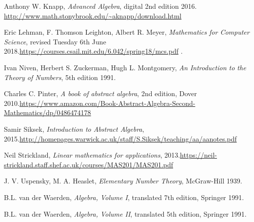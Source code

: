 \documentclass[numbers=enddot,12pt,final,onecolumn,notitlepage]{scrartcl}%
\numberwithin{exer}{subsection}
\theoremstyle{definition}
\begin{document}
\begin{thebibliography}{999999999}
Anthony W. Knapp, \textit{Advanced Algebra}, digital
2nd edition 2016. \newline\url{http://www.math.stonybrook.edu/~aknapp/download.html}

Eric Lehman, F. Thomson Leighton, Albert R. Meyer,
\textit{Mathematics for Computer Science}, revised Tuesday 6th June
2018.\newline\url{https://courses.csail.mit.edu/6.042/spring18/mcs.pdf} .

Ivan Niven, Herbert S. Zuckerman, Hugh L.
Montgomery, \textit{An Introduction to the Theory of Numbers}, 5th edition 1991.

Charles C. Pinter, \textit{A book of abstract
algebra}, 2nd edition, Dover 2010.\newline\url{https://www.amazon.com/Book-Abstract-Algebra-Second-Mathematics/dp/0486474178}

Samir Siksek, \textit{Introduction to Abstract
Algebra}, 2015.\newline\url{http://homepages.warwick.ac.uk/staff/S.Siksek/teaching/aa/aanotes.pdf}

Neil Strickland, \textit{Linear mathematics for
applications}, 2013.\newline\url{https://neil-strickland.staff.shef.ac.uk/courses/MAS201/MAS201.pdf}

J. V. Uspensky, M. A. Heaslet,
\textit{Elementary Number Theory}, McGraw-Hill 1939.

B.L. van der Waerden, \textit{Algebra, Volume I},
translated 7th edition, Springer 1991.

B.L. van der Waerden, \textit{Algebra, Volume
II}, translated 5th edition, Springer 1991.
\end{thebibliography}
\end{document}
